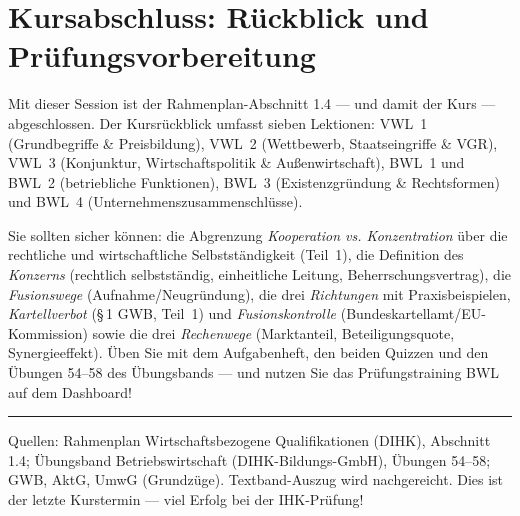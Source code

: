 \documentclass[11pt, a4paper]{article}
\begin{document}
\section{Kursabschluss: Rückblick und Prüfungsvorbereitung}

Mit dieser Session ist der Rahmenplan-Abschnitt 1.4 --- und damit der Kurs ---
abgeschlossen. Der Kursrückblick umfasst sieben Lektionen: VWL~1 (Grundbegriffe \&
Preisbildung), VWL~2 (Wettbewerb, Staatseingriffe \& VGR), VWL~3 (Konjunktur,
Wirtschaftspolitik \& Außenwirtschaft), BWL~1 und BWL~2 (betriebliche Funktionen),
BWL~3 (Existenzgründung \& Rechtsformen) und BWL~4 (Unternehmenszusammenschlüsse).

\begin{merksatz}[title={\bfseries Wichtig für die Prüfungsvorbereitung}]
Sie sollten sicher können: die Abgrenzung \emph{Kooperation vs. Konzentration} über die
rechtliche und wirtschaftliche Selbstständigkeit (Teil~1), die Definition des
\emph{Konzerns} (rechtlich selbstständig, einheitliche Leitung, Beherrschungsvertrag),
die \emph{Fusionswege} (Aufnahme/Neugründung), die drei \emph{Richtungen} mit
Praxisbeispielen, \emph{Kartellverbot} (\S\,1 GWB, Teil~1) und \emph{Fusionskontrolle}
(Bundeskartellamt/EU-Kommission) sowie die drei \emph{Rechenwege} (Marktanteil,
Beteiligungsquote, Synergieeffekt). Üben Sie mit dem Aufgabenheft, den beiden Quizzen
und den Übungen 54--58 des Übungsbands --- und nutzen Sie das Prüfungstraining BWL auf
dem Dashboard!
\end{merksatz}

\vspace{1em}
\hrule
\vspace{0.8em}
\noindent\textsf{\small Quellen: Rahmenplan Wirtschaftsbezogene Qualifikationen (DIHK), Abschnitt 1.4;
Übungsband Betriebswirtschaft (DIHK-Bildungs-GmbH), Übungen 54--58; GWB, AktG, UmwG (Grundzüge).
Textband-Auszug wird nachgereicht. Dies ist der letzte Kurstermin --- viel Erfolg bei der IHK-Prüfung!}
\end{document}

